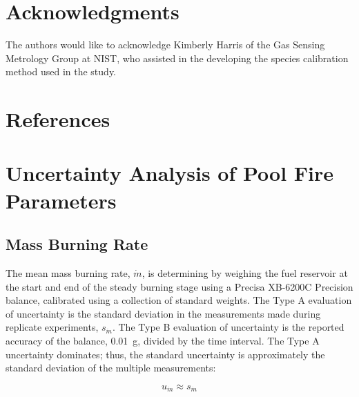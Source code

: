 \documentclass[12pt]{article}
\begin{document}
\section*{Acknowledgments}
The authors would like to acknowledge Kimberly Harris of the Gas Sensing Metrology Group at NIST, who assisted in the developing the species calibration method used in the study.

\clearpage

\section*{References}




\clearpage


\appendix
{}
\makeatletter
\newcommand{\section@cntformat}{Appendix:\ }
\makeatother

\section{Uncertainty Analysis of Pool Fire Parameters}\label{sec:Uncertainty_Pool_Fire_Parameters}

\subsection{Mass Burning Rate}
\label{ssec:Mass_Burning_Flux}

The mean mass burning rate, $\dot{m}$, is determining by weighing the fuel reservoir at the start and end of the steady burning stage using a Precisa XB-6200C Precision balance, calibrated using a collection of standard weights. The Type A evaluation of uncertainty is the standard deviation in the measurements made during replicate experiments, $s_{\scriptscriptstyle \dot{m}}$. The Type B evaluation of uncertainty is the reported accuracy of the balance, 0.01~g, divided by the time interval. The Type A uncertainty dominates; thus, the standard uncertainty is approximately the standard deviation of the multiple measurements:

\begin{equation}
\label{eq:mass_rate_uncertainty}
u_{\scriptscriptstyle \dot{m}} \approx s_{\scriptscriptstyle \dot{m} }
\end{equation}
\end{document}
